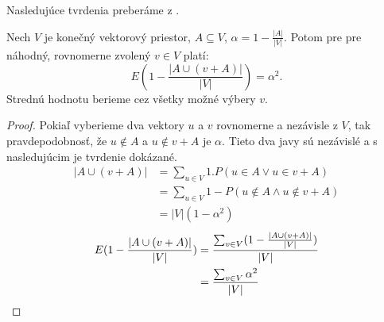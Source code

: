 Nasledujúce tvrdenia preberáme z \cite{linear-hash-functions}.

\begin{lemma}
\label{lemma-choose-random-vector}
Nech $V$ je konečný vektorový priestor, $A \subseteq V$, $\alpha = 1 - \frac{|A|}{|V|}$. Potom pre pre náhodný, rovnomerne zvolený $v \in V$ platí:
\begin{displaymath}
E (1 - \frac{|A \cup (v + A)|}{|V|}) = \alpha^2 \textit{.}
\end{displaymath}
Strednú hodnotu berieme cez všetky možné výbery $v$.
\end{lemma}
\begin{proof}
Pokiaľ vyberieme dva vektory $u$ a $v$ rovnomerne a nezávisle z $V$, tak pravdepodobnosť, že $u \notin A$ a $u \notin v + A$ je $\alpha$. Tieto dva javy sú nezávislé a s nasledujúcim je tvrdenie dokázané.
\begin{displaymath}
\begin{split}
|A \cup (v + A)| 
	& = \sum_{u \in V} 1 . P(u \in A \vee u \in v + A) \\ 
	& = \sum_{u \in V} 1 - P(u \notin A \wedge u \notin v + A) \\ 
	& = |V| (1 - \alpha ^ 2)
\end{split}
\end{displaymath}
\begin{displaymath}
\begin{split}
E (1 - \frac{|A \cup (v + A)|}{|V|}) 
	& = \frac{\sum\displaylimits_{v \in V}(1 - \frac{|A \cup (v + A)|}{|V|})}{|V|} \\
	& = \frac{\sum\displaylimits_{v \in V}\alpha ^ 2}{|V|}
\end{split}
\end{displaymath}
\end{proof}

